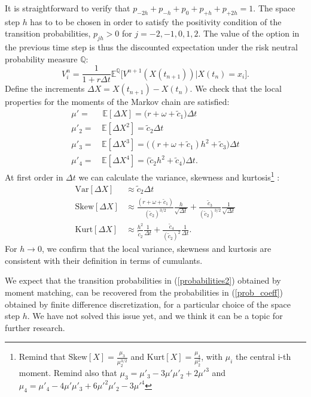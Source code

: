 \documentclass[]{interact}
\newcommand{\numberset}{\mathbb}
\newcommand{\E}{\numberset{E}}
\newcommand{\Q}{\numberset{Q}}
\theoremstyle{plain}%
\theoremstyle{definition}
\theoremstyle{remark}
\begin{document}
It is straightforward to verify that $p_{-2h} + p_{-h} + p_{0} + p_{+h} + p_{+2h}  = 1$.
The space step $h$ has to to be chosen in order to satisfy the positivity condition of the transition probabilities, $p_{jh} > 0$ for $j=-2,-1,0,1,2$.
The value of the option in the previous time step is thus the discounted expectation 
under the risk neutral probability measure $\Q$:
\begin{equation}
 V^n_i = \frac{1}{1+r\Delta t} \E^{\Q} \biggl[ V^{n+1}(X(t_{n+1})) \bigg| X(t_n)=x_i \biggr]. 
\end{equation}
Define the increments $\Delta X = X(t_{n+1}) - X(t_n)$.
We check that the local properties for the moments of the Markov chain are satisfied:
\begin{align}
 \mu' =& \; \E[\Delta X] =  \bigl( r+\omega+\tilde c_1 \bigr) \Delta t \\
 \mu'_2 =& \, \E[\Delta X^2] =  \tilde c_2 \Delta t \\
 \mu'_3 =& \, \E[\Delta X^3] =  \bigl( (r+\omega+\tilde c_1)h^2 + \tilde c_3 \bigr) \Delta t \\
 \mu'_4 =& \,\E[\Delta X^4] = \bigl(\tilde c_2 h^2 + \tilde c_4\bigr) \Delta t.
\end{align}
At first order in $\Delta t$ we can calculate the variance, skewness and kurtosis\footnote{Remind that $\mbox{Skew}[X]=\frac{\mu_3}{\mu_2^{3/2}}$
and $\mbox{Kurt}[X]=\frac{\mu_4}{\mu_2^{2}}$, with $\mu_i$ the central i-th moment. Remind also that $\mu_3 = \mu'_3-3\mu'\mu'_2
+2\mu'^3$ and $\mu_4 = \mu'_4 -4\mu'\mu'_3 +6\mu'^2\mu'_2 -3\mu'^4$ } :
\begin{align}
 \mbox{Var}[\Delta X] &\approx \tilde c_2 \Delta t \\
 \mbox{Skew}[\Delta X] &\approx \frac{(r+\omega+\tilde c_1)}{(\tilde c_2)^{3/2}} 
 \frac{h}{\sqrt{\Delta t}} + \frac{\tilde c_3}{(\tilde c_2)^{3/2}} \frac{1}{\sqrt{\Delta t}} \\
 \mbox{Kurt}[\Delta X] &\approx \frac{h^2}{\tilde c_2}
 \frac{1}{\Delta t} + \frac{\tilde c_4}{(\tilde c_2)^2} \frac{1}{\Delta t}.
\end{align}
For $h\to 0$, we confirm that the local variance,
skewness and kurtosis are consistent with their definition in terms of cumulants.

We expect that the transition probabilities in (\ref{probabilities2}) obtained by moment matching, can be recovered from the probabilities in
(\ref{prob_coeff}) obtained by finite difference discretization, for a particular choice of the space step $h$. 
We have not solved this issue yet, and we think it can be a topic for further research. 
\end{document}
